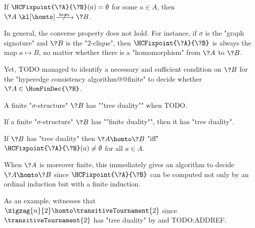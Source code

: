 \begin{corollary}
	\AP\label{coro:HC-empty-implies-no-hom}
	If $\HCFixpoint{\?A}{\?B}(a) = \emptyset$ for some $a\in A$, then
	$\?A \nothomto \?B$.
\end{corollary}

In general, the converse property does not hold. For instance, if $\sigma$ is the
"graph signature" and $\?B$ is the "$2$-clique", then $\HCFixpoint{\?A}{\?B}$
is always the map $a \mapsto B$, no matter whether there is a "homomorphism" from
$\?A$ to $\?B$.

Yet, TODO managed to identify a necessary and sufficient condition on $\?B$ for
the "hyperedge consistency algorithm@@finite" to decide whether $\?A \in \HomFinDec{\?B}$.
\begin{definition}
	\AP\label{defn:tree-duality}
	A finite "$\sigma$-structure" $\?B$ has ""tree duality"" when TODO.
\end{definition}

\begin{proposition}
	\AP\label{prop:finite-duality-implies-tree-duality}
	If a finite "$\sigma$-structure" $\?B$ has ""finite duality"",
	then it has "tree duality".
\end{proposition}

\begin{proposition}
	\AP\label{prop:hyperedge-consistency-tree-duality}
	If $\?B$ has "tree duality" then $\?A \homto \?B$ "iff"
	$\HCFixpoint{\?A}{\?B}(a) \neq \emptyset$ for all $a\in A$.
\end{proposition}

When $\?A$ is moreover finite, this immediately gives an algorithm to decide
$\?A \homto \?B$ since $\HCFixpoint{\?A}{\?B}$ can be computed not only
by an ordinal induction but with a finite induction.

As an example,  witnesses that
$\zigzag{n}{2} \homto \transitiveTournament{2}$ since $\transitiveTournament{2}$
has "tree duality" by  and TODO:ADDREF.

